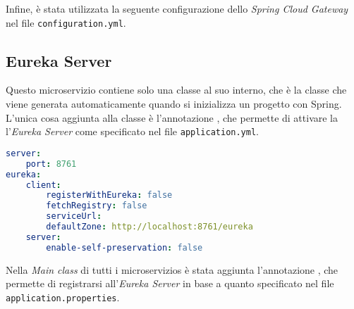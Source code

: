 

\noindent Infine, è stata utilizzata la seguente configurazione dello \textit{Spring Cloud Gateway} nel file \texttt{configuration.yml}.




\subsection{Eureka Server}
Questo \gls{microservizio} contiene solo una classe al suo interno, che è la classe che viene generata automaticamente quando si inizializza un progetto con Spring. L'unica cosa aggiunta alla classe è l'annotazione , che permette di  attivare la l'\textit{Eureka Server} come specificato nel file \texttt{application.yml}.

\begin{lstlisting}[language = yaml, caption = {File \texttt{application.yml} del microservizio \texttt{Eureka Server}}]
server:
    port: 8761
eureka:
    client:
        registerWithEureka: false 
        fetchRegistry: false
        serviceUrl:
        defaultZone: http://localhost:8761/eureka
    server:
        enable-self-preservation: false
\end{lstlisting}
\noindent Nella \textit{Main class} di tutti i \glspl{microservizio}  è stata aggiunta l'annotazione , che permette di registrarsi all'\textit{Eureka Server} in base a quanto specificato nel file \texttt{application.properties}.\\

